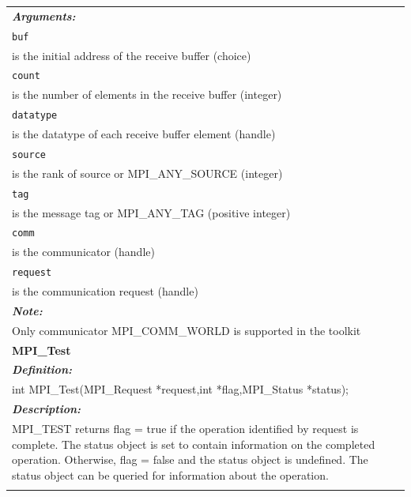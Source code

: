\begin{longtable}{|p{5.5in}|}
\emph{\bfseries{Arguments: }} \\
\lstinline$buf$\\
\hspace{0.5cm}     is the initial address of the receive buffer (choice)\\
\lstinline$count$\\
\hspace{0.5cm}     is the number of elements in the receive buffer (integer)\\
\lstinline$datatype$\\
\hspace{0.5cm}     is the datatype of each receive buffer element (handle)\\
\lstinline$source$\\
\hspace{0.5cm}     is the rank of source or MPI\_ANY\_SOURCE (integer)\\
\lstinline$tag$\\
\hspace{0.5cm}     is the message tag or MPI\_ANY\_TAG (positive integer)\\
\lstinline$comm$\\
\hspace{0.5cm}     is the communicator (handle)\\
\lstinline$request $\\
\hspace{0.5cm}     is the communication request (handle) \\
\vspace{-0.3cm}

\emph{\bfseries{Note: }} \\
Only communicator MPI\_COMM\_WORLD is supported in the toolkit\\

\hline

\vspace{-0.8cm}

\LARGE{\bfseries{MPI\_Test}} \\

\vspace{-0.3cm}

\emph{\bfseries{Definition: }} \\
int MPI\_Test(MPI\_Request *request,int *flag,MPI\_Status *status); \\
\vspace{-0.3cm}

\emph{\bfseries{Description: }} \\
MPI\_TEST returns flag = true if the operation identified by request is complete. The status object is set to contain information on the completed operation. Otherwise, flag = false and the status object is undefined. The status object can be queried for information about the operation. \\
\vspace{-0.3cm}


\end{longtable}
